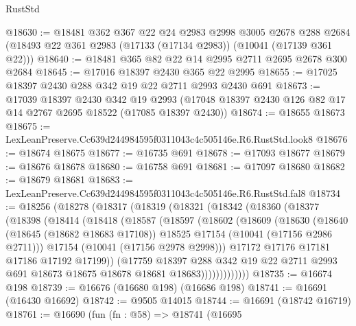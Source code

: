 \begin{lexlean}{RustStd}
\begin{coremodule}
@18630 := @18481
    @362
    @367
    @22
    @24
    @2983
    @2998
    @3005
    @2678
    @288
    @2684
    (@18493 @22 @361 @2983 (@17133 (@17134 @2983)) (@10041 (@17139 @361 @22)))
@18640 := @18481 @365 @82 @22 @14 @2995 @2711 @2695 @2678 @300 @2684
@18645 := @17016 @18397 @2430 @365 @22 @2995
@18655 := @17025 @18397 @2430 @288 @342 @19 @22 @2711 @2993 @2430 @691
@18673 := @17039
    @18397
    @2430
    @342
    @19
    @2993
    (@17048 @18397 @2430 @126 @82 @17 @14 @2767 @2695 @18522 (@17085 @18397 @2430))
@18674 := @18655 @18673
@18675 := LexLeanPreserve.Cc639d244984595f0311043c4c505146e.R6.RustStd.look8
@18676 := @18674 @18675
@18677 := @16735 @691
@18678 := @17093 @18677
@18679 := @18676 @18678
@18680 := @16758 @691
@18681 := @17097 @18680
@18682 := @18679 @18681
@18683 := LexLeanPreserve.Cc639d244984595f0311043c4c505146e.R6.RustStd.fal8
@18734 := @18256
    (@18278
      (@18317
        (@18319
          (@18321
            (@18342
              (@18360
                (@18377
                  (@18398
                    (@18414
                      (@18418
                        (@18587
                          (@18597
                            (@18602
                              (@18609
                                (@18630
                                  (@18640
                                    (@18645 (@18682 @18683 @17108))
                                    @18525
                                    @17154
                                    (@10041 (@17156 @2986 @2711)))
                                  @17154
                                  (@10041 (@17156 @2978 @2998)))
                                @17172
                                @17176
                                @17181
                                @17186
                                @17192
                                @17199))
                            (@17759
                              @18397
                              @288
                              @342
                              @19
                              @22
                              @2711
                              @2993
                              @691
                              @18673
                              @18675
                              @18678
                              @18681
                              @18683)))))))))))))
@18735 := @16674 @198
@18739 := @16676 (@16680 @198) (@16686 @198)
@18741 := @16691 (@16430 @16692)
@18742 := @9505 @14015
@18744 := @16691 (@18742 @16719)
@18761 := @16690
    (fun (fn : @58) =>
    @18741
      (@16695

\end{coremodule}
\end{lexlean}

